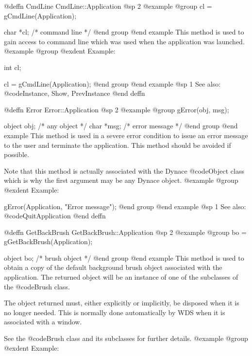 @deffn {CmdLine} CmdLine::Application
@sp 2
@example
@group
cl = gCmdLine(Application);

char    *cl;    /*  command line   */
@end group
@end example
This method is used to gain access to command line which was used when
the application was launched.
@example
@group
@exdent Example:

int     cl;

cl = gCmdLine(Application);
@end group
@end example
@sp 1
See also:  @code{Instance, Show, PrevInstance}
@end deffn















@deffn {Error} Error::Application
@sp 2
@example
@group
gError(obj, msg);

object  obj;    /*  any object     */
char    *msg;   /*  error message  */
@end group
@end example
This method is used in a severe error condition to issue an error message
to the user and terminate the application.  This method should be avoided
if possible.

Note that this method is actually associated with the Dynace @code{Object}
class which is why the first argument may be any Dynace object.
@example
@group
@exdent Example:

gError(Application, "Error message");
@end group
@end example
@sp 1
See also:  @code{QuitApplication}
@end deffn












@deffn {GetBackBrush} GetBackBrush::Application
@sp 2
@example
@group
bo = gGetBackBrush(Application);

object  bo;     /*  brush object  */
@end group
@end example
This method is used to obtain a copy of the default background brush
object associated with the application.  The returned object will be an
instance of one of the subclasses of the @code{Brush} class.

The object returned must, either explicitly or implicitly, be
disposed when it is no longer needed.  This is normally done
automatically by WDS when it is associated with a window.

See the @code{Brush} class and its subclasses for further details.
@example
@group
@exdent Example:

